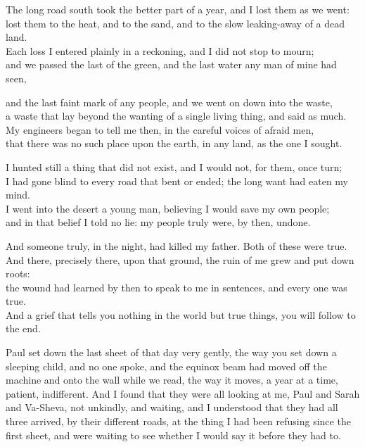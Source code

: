 \begin{scripture}
The long road south took the better part of a year, and I lost them as we went: \\
lost them to the heat, and to the sand, and to the slow leaking-away of a dead land. \\
Each loss I entered plainly in a reckoning, and I did not stop to mourn; \\
and we passed the last of the green, and the last water any man of mine had seen, \\
\medskip

and the last faint mark of any people, and we went on down into the waste, \\
a waste that lay beyond the wanting of a single living thing, and said as much. \\
My engineers began to tell me then, in the careful voices of afraid men, \\
that there was no such place upon the earth, in any land, as the one I sought. \\
\medskip

I hunted still a thing that did not exist, and I would not, for them, once turn; \\
I had gone blind to every road that bent or ended; the long want had eaten my mind. \\
I went into the desert a young man, believing I would save my own people; \\
and in that belief I told no lie: my people truly were, by then, undone. \\
\medskip

And someone truly, in the night, had killed my father. Both of these were true. \\
And there, precisely there, upon that ground, the ruin of me grew and put down roots: \\
the wound had learned by then to speak to me in sentences, and every one was true. \\
And a grief that tells you nothing in the world but true things, you will follow to the end. \\
\end{scripture}

\ornament

Paul set down the last sheet of that day very gently, the way you set down a sleeping child, and no one spoke, and the equinox beam had moved off the machine and onto the wall while we read, the way it moves, a year at a time, patient, indifferent. And I found that they were all looking at me, Paul and Sarah and Va-Sheva, not unkindly, and waiting, and I understood that they had all three arrived, by their different roads, at the thing I had been refusing since the first sheet, and were waiting to see whether I would say it before they had to.\par

